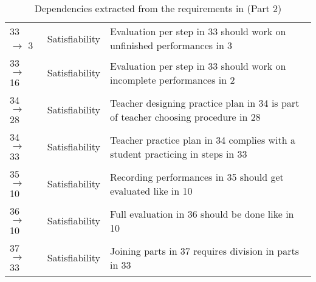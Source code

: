 \documentclass[a4paper,11pt]{article}
\begin{document}
\begin{table}[h!]
\begin{tabular}{l | l | p{10cm}}
					33 $\rightarrow$ 3 & Satisfiability & Evaluation per step in 33 should work on unfinished performances in 3 \\
					33 $\rightarrow$ 16 & Satisfiability & Evaluation per step in 33 should work on incomplete performances in 2 \\
					34 $\rightarrow$ 28 & Satisfiability & Teacher designing practice plan in 34 is part of teacher choosing procedure in 28 \\
					34 $\rightarrow$ 33 & Satisfiability & Teacher practice plan in 34 complies with a student practicing in steps in 33 \\
					35 $\rightarrow$ 10 & Satisfiability & Recording performances in 35 should get evaluated like in 10 \\
					36 $\rightarrow$ 10 & Satisfiability & Full evaluation in 36 should be done like in 10 \\
					37 $\rightarrow$ 33 & Satisfiability & Joining parts in 37 requires division in parts in 33 \\
				\end{tabular}
				\caption{Dependencies extracted from the requirements in \cite{VEMUS} (Part 2)}
				\label{table:dep2}
			\end{table}
\end{document}

